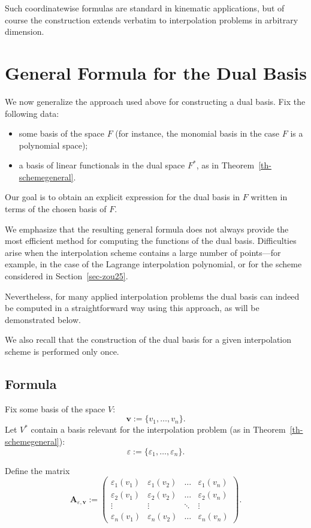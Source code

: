 \documentclass{article}
\theoremstyle{definition}
\theoremstyle{definition}
\numberwithin{figure}{section}
\newcommand{\1}{\mathbf{1}}
\begin{document}
Such coordinatewise formulas are standard in kinematic applications, but of course the construction extends verbatim to interpolation problems in arbitrary dimension.

\section{General Formula for the Dual Basis}\label{sec-generalforma}

We now generalize the approach used above for constructing a dual basis.  
Fix the following data:
\begin{itemize}
    \item some basis of the space \(F\) (for instance, the monomial basis in the case \(F\) is a polynomial space);
    \item a basis of linear functionals in the dual space \(F^*\), as in Theorem~\ref{th-schemegeneral}.
\end{itemize}

Our goal is to obtain an explicit expression for the dual basis in \(F\) written in terms of the chosen basis of \(F\).

We emphasize that the resulting general formula does not always provide the most efficient method for computing the functions of the dual basis. Difficulties arise when the interpolation scheme contains a large number of points—for example, in the case of the Lagrange interpolation polynomial, or for the scheme considered in Section~\ref{sec-zou25}.

Nevertheless, for many applied interpolation problems the dual basis can indeed be computed in a straightforward way using this approach, as will be demonstrated below.

We also recall that the construction of the dual basis for a given interpolation scheme is performed only once.

\subsection{Formula}

Fix some basis of the space \(V\):
\[
    \mathbf{v} := \{ v_1, \dots, v_n \}.
\]
Let \(V^*\) contain a basis relevant for the interpolation problem (as in Theorem~\ref{th-schemegeneral}):
\[
    \varepsilon := \{ \varepsilon_1, \dots, \varepsilon_n \}.
\]

Define the matrix
\begin{equation}\label{eq-matA}
\mathbf{A}_{\varepsilon,\mathbf{v}} :=
\begin{pmatrix}
\varepsilon_1(v_1) & \varepsilon_1(v_2) & \dots & \varepsilon_1(v_n)\\
\varepsilon_2(v_1) & \varepsilon_2(v_2) & \dots & \varepsilon_2(v_n)\\
\vdots & \vdots & \ddots & \vdots\\
\varepsilon_n(v_1) & \varepsilon_n(v_2) & \dots & \varepsilon_n(v_n)
\end{pmatrix}.
\end{equation}
\end{document}

